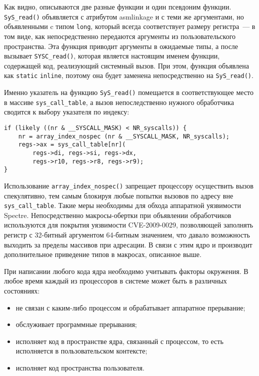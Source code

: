 Как видно, описываются две разные функции и один псевдоним функции.
\texttt{SyS\_read()} объявляется с атрибутом asmlinkage и с теми же аргументами,
но объявленными c типом \texttt{long}, который всегда соответствует размеру
регистра~--- в том виде, как непосредственно передаются аргументы из
пользовательского пространства. Эта функция приводит аргументы в ожидаемые типы,
а после вызывает \texttt{SYSC\_read()}, которая является настоящим именем
функции, содержащей код, реализующий системный вызов. При этом, функция
объявлена как \texttt{static} \texttt{inline}, поэтому она будет заменена
непосредственно на \texttt{SyS\_read()}.

Именно указатель на функцию \texttt{SyS\_read()} помещается в соответствующее
место в массиве \texttt{sys\_call\_table}, а вызов непоследственно нужного
обработчика сводится к выбору указателя по индексу:
\medskip
\begin{lstlisting}[style=cstyle]
if (likely ((nr & __SYSCALL_MASK) < NR_syscalls)) {
	nr = array_index_nospec (nr & __SYSCALL_MASK, NR_syscalls);
	regs->ax = sys_call_table[nr](
		regs->di, regs->si, regs->dx,
		regs->r10, regs->r8, regs->r9);
}
\end{lstlisting}
\medskip

Использование \texttt{array\_index\_nospec()} запрещает процессору осуществить
вызов спекулятивно, тем самым блокируя любые попытки вызовов по адресу вне
\texttt{sys\_call\_table}. Такие меры необходимы для обхода аппаратной
уязвимости Spectre. Непосредственно макросы-обертки при объявлении обработчиков
используются для покрытия уязвимости CVE-2009-0029, позволяющей заполнять
регистр с 32-битный аргументом 64-битным значением, что давало возможность
выходить за пределы массивов при адресации. В связи с этим ядро и производит
дополнительное приведение типов в макросах, описанное выше.

При написании любого кода ядра необходимо учитывать факторы окружения. В любое
время каждый из процессоров в системе может быть в различных состояниях:
\begin{itemize}
\item не связан с каким-либо процессом и обрабатывает аппаратное прерывание;
\item обслуживает программные прерывания;
\item исполняет код в пространстве ядра, связанный с процессом, то есть
  исполняется в пользовательском контексте;
\item исполняет код пространства пользователя.
\end{itemize}

